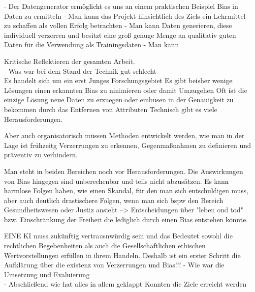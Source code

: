 - Der Datengenerator ermöglicht es uns an einem praktischen Beispiel Bias in Daten zu ermitteln
- Man kann das Projekt hinsichtlich des Ziels ein Lehrmittel zu schaffen als vollen Erfolg betrachten
- Man kann Daten generieren, diese individuell verzerren und besitzt eine groß genuge Menge an qualitativ guten Daten für die Verwendung als Trainingsdaten
- Man kann 

Kritische Reflektieren der gesamten Arbeit.\\
- Was war bei dem Stand der Technik gut schlecht\\
    Es handelt sich um ein erst Junges Forschungsgebiet
    Es gibt beisher wenige Lösungen einen erkannten Bias zu ninimieren oder damit Umzugehen
    Oft ist die einzige Lösung neue Daten zu erzuegen 
    oder einbusen in der Genauigkeit zu bekommen durch das Entfernen von Attributen
    Technisch gibt es viele Herausforderungen.

    Aber auch organisatorisch müssen Methoden entwickelt werden, wie man in der Lage ist frühzeitg Verzerrungen zu erkennen, Gegenmaßnahmen zu definieren und präventiv zu verhindern.

    Man steht in beiden Bereichen noch vor Herausforderungen. Die Auswirkungen von Bias hingegen sind unberechenbar und teils nicht abzusätzen.
    Es kann harmlose Folgen haben, wie einen Skandal, für den man sich entschuldigen muss, aber auch deutlich drastischere Folgen, wenn man sich bspw den Bereich Gesundheitswesen oder Justiz ansieht
    --> Entscheidungen über "leben ond tod" bzw. Einschränkung der Freiheit die lediglich durch einen Bias entstehen könnte.

    EINE KI muss zukünftig vertrausnwürdig sein und das Bedeutet sowohl die rechtlichen Begebenheiten als auch die Gesellschaftlichen ethischen Wertvorstellungen erfüllen in ihrem Handeln.
    Deshalb ist ein erster Schritt die Aufklärung über die existenz von Verzerrungen und Bias!!!
- Wie war die Umsetzung und Evaluierung\\
- Abschließend wie hat alles in allem geklappt Konnten die Ziele erreicht werden

